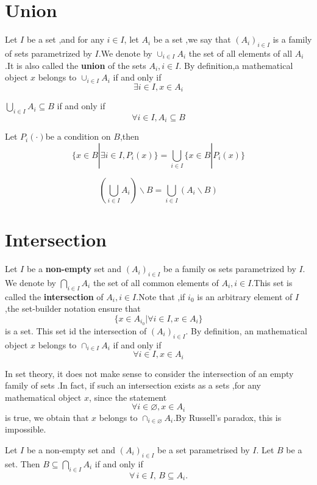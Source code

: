 \documentclass{book}
\begin{document}
\section{Union}
\begin{definitionenv}
    Let $I$ be a set ,and for any $i \in I$, let $A_i$ be a set ,we say that $(A_i)_{i\in I}$ is a family of sets parametrized by $I$.We denote by $\cup_{i \in I}A_i$ the set of all elements of all $A_i$.It is also called the \textbf{union} of the sets $A_i,i\in I$. By definition,a mathematical object $x$ belongs to $\cup_{i \in I}A_i$ if and only if $$\exists i\in I,x\in A_i$$ 
\end{definitionenv}
\begin{propositionenv}
    $ \displaystyle \bigcup_{i\in I}A_i\subseteq B$ if and only if $$\forall i\in I,A_i\subseteq B$$
\end{propositionenv}
\begin{corollaryenv}\label{corollary2.6.1}
    Let $P_i(\cdot) $be a condition on $B$,then
    $$\{x\in B|\exists i\in I,P_i(x)\}=\bigcup_{i\in I}\{x\in B|P_i(x)\}$$
\end{corollaryenv}
\begin{propositionenv}
    $$\left( \bigcup _{i\in I}A_i\right)\backslash B=\bigcup_{i\in I}\left( A_i\backslash B\right)$$
\end{propositionenv}
\section{Intersection}
\begin{definitionenv}
    Let $I$ be a \textbf{non-empty} set and $(A_i)_{i\in I} $ be a family os sets parametrized by $I$. We denote by $\displaystyle \bigcap_{i\in I}A_i $ the set of all common elements of $A_i,i\in I$.This set is called the \textbf{intersection} of $A_i,i\in I$.Note that ,if $i_0$ is an arbitrary element of $I$ ,the set-builder notation ensure that
    $$\{x\in A_{i_0}|\forall i\in I,x\in A_i\}$$ is a set. This set id the intersection of $(A_i)_{i\in I}$.
    \newline
    By definition, an mathematical object $x$ belongs to $\cap _{i\in I}A_i$ if and only if $$\forall i\in I ,x\in A_i$$
    
\end{definitionenv}
\begin{remark}
    In set theory, it does not make sense to consider the intersection of an empty family of sets .In fact, if such an intersection exists as a sets ,for any mathematical object $x$, since the statement $$\forall i\in \varnothing,x \in A_i$$is true, we obtain that $x$ belongs to $\cap_{i\in \varnothing}A_i$.By Russell's paradox, this is impossible.
\end{remark}
\begin{propositionenv}\label{proposition2.7.1}
Let \( I \) be a non-empty set and \( (A_i)_{i \in I} \) be a set parametrised by \( I \). Let \( B \) be a set. Then \( B \subseteq \bigcap_{i \in I} A_i \) if and only if
\[
\forall\, i \in I,\, B \subseteq A_i.
\]
\end{propositionenv}
\end{document}
